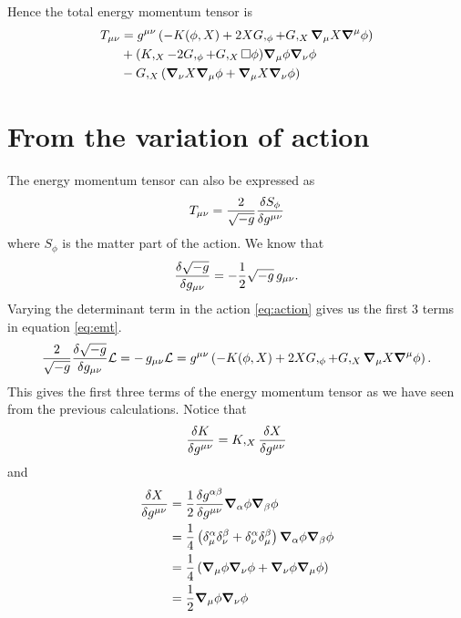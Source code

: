 \documentclass[12pt,a4paper,draft]{article}
\begin{document}
Hence the total energy momentum tensor is 
\begin{equation}
\begin{split}
    T_{\mu \nu} &= g^{\mu \nu}\left(-K(\phi,X)+2 X G,_{\phi} + G,_{X} \grad_{\mu} X \grad^{\mu} \phi \right) \\
    & + (K,_X- 2 G,_{\phi}+G,_X \Box \phi) \grad_{\mu} \phi \grad_{\nu} \phi \\
    &- G,_{X} (\grad_{\nu} X \grad_{\mu} \phi+\grad_{\mu}X \grad_{\nu} \phi )
    \end{split}
    \label{eq:emt}
\end{equation}
\section{From the variation of action}
The energy momentum tensor can also be expressed as 
\begin{equation}
    T_{\mu \nu} = \frac{2}{\sqrt{-g}} \fdv{S_{\phi}}{g^{\mu \nu}}
\end{equation}
where $S_{\phi}$ is the matter part of the action. We know that 
\begin{equation}
    \fdv{\sqrt{-g}}{g_{\mu \nu}} = -\frac{1}{2} \sqrt{-g} \, g_{\mu \nu}. 
\end{equation}
Varying the determinant term in the action \eqref{eq:action} gives us the first 3 terms in equation \eqref{eq:emt}. \\
\begin{equation}
   \frac{2}{\sqrt{-g}} \fdv{\sqrt{-g}}{g_{\mu \nu}}\mathcal{L} = -\, g_{\mu \nu} \mathcal{L} = g^{\mu \nu}\left(-K(\phi,X)+2 X G,_{\phi} + G,_{X} \grad_{\mu} X \grad^{\mu} \phi \right) . 
\end{equation}
This gives the first three terms of the energy momentum tensor as we have seen from the previous calculations. 
Notice that
\begin{equation}
    \fdv{K}{g^{\mu \nu}} = K,_X \fdv{X}{g^{\mu \nu}}
\end{equation}
and
\begin{equation}
\begin{split}
    \fdv{X}{g^{\mu \nu}} &= \frac{1}{2} \fdv{ g^{\alpha \beta}}{g^{\mu \nu}}  \grad_{\alpha} \phi \grad_{\beta} \phi \\
    &= \frac{1}{4} \left( \delta^{\alpha}_{\mu} \delta^{\beta}_{\nu}+ \delta^{\alpha}_{\nu} \delta^{\beta}_{\mu} \right) \grad_{\alpha} \phi \grad_{\beta} \phi \\
    &=\frac{1}{4} \left( \grad_{\mu} \phi \grad_{\nu} \phi+\grad_{\nu} \phi \grad_{\mu} \phi \right) \\
    &= \frac{1}{2} \grad_{\mu} \phi \grad_{\nu} \phi
    \end{split}
\end{equation}
\end{document}
